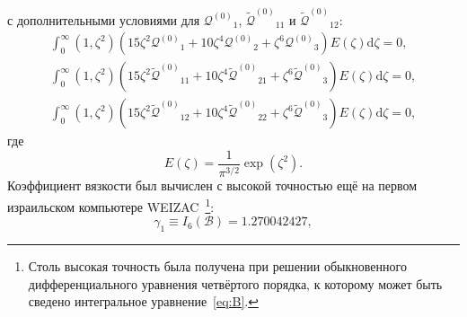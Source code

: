 \documentclass[a4paper,12pt]{article}
\newcommand{\dd}{\mathrm{d}}
\newcommand{\Q}{\ensuremath{\mathcal{Q}^{(0)}}}
\newcommand{\QQ}{\ensuremath{\tilde{\mathcal{Q}}^{(0)}}}
\begin{document}
с дополнительными условиями для \(\Q_1\), \(\QQ_{11}\) и \(\QQ_{12}\):
\begin{gather}\label{eq:Q1_constraint}
    \int_0^\infty (1,\zeta^2)\left( 15\zeta^2\Q_1 + 10\zeta^4\Q_2 + \zeta^6\Q_3 \right) E(\zeta) \dd\zeta = 0, \\
    \int_0^\infty (1,\zeta^2)\left( 15\zeta^2\QQ_{11} + 10\zeta^4\QQ_{21} + \zeta^6\QQ_3 \right) E(\zeta) \dd\zeta = 0, \\
    \int_0^\infty (1,\zeta^2)\left( 15\zeta^2\QQ_{12} + 10\zeta^4\QQ_{22} + \zeta^6\QQ_3 \right) E(\zeta) \dd\zeta = 0,
\end{gather}
где
\begin{equation}\label{eq:E}
    E(\zeta) = \frac1{\pi^{3/2}}\exp\left(\zeta^2\right).
\end{equation}
Коэффициент вязкости был вычислен с высокой точностью ещё на первом израильском компьютере WEIZAC~\cite{Pekeris1957}\footnote{
    Столь высокая точность была получена при решении обыкновенного дифференциального уравнения четвёртого порядка,
    к которому может быть сведено интегральное уравнение~\eqref{eq:B}.
}:
\begin{equation}\label{eq:gamma1}
    \gamma_1 \equiv I_6(\mathcal{B}) = 1.270042427,
\end{equation}
\end{document}
